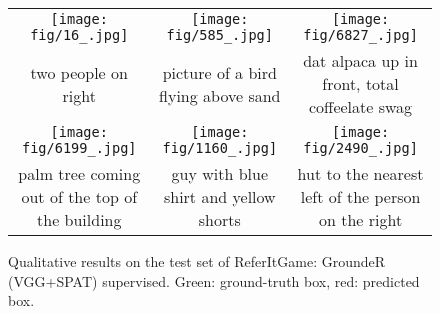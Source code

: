 \begin{figure*}[t]
\center
\begin{tabular}{c@{\ \ }c@{\ \ }c}
\texttt{[image: fig/16\_.jpg]} & 
\texttt{[image: fig/585\_.jpg]} &
\texttt{[image: fig/6827\_.jpg]} \\
\multicolumn{1}{m{3.5cm}}{\small{
two people on right}} &
\multicolumn{1}{m{3.5cm}}{\small{
picture of a bird flying above sand}} &
\multicolumn{1}{m{3.5cm}}{\small{
dat alpaca up in front, total coffeelate swag}} \\
\texttt{[image: fig/6199\_.jpg]} &
\texttt{[image: fig/1160\_.jpg]} & 
\texttt{[image: fig/2490\_.jpg]} \\
\multicolumn{1}{m{3.5cm}}{\small{
palm tree coming out of the top of the building}} &
\multicolumn{1}{m{3.5cm}}{\small{
guy with blue shirt and yellow shorts}} &
\multicolumn{1}{m{3.5cm}}{\small{
hut to the nearest left of the person on the right}} \\
\end{tabular}
\caption{Qualitative results on the test set of ReferItGame: GroundeR (VGG+SPAT) supervised. Green: ground-truth box, red: predicted box.}
\label{fig:qualitative_referit}
\end{figure*}

